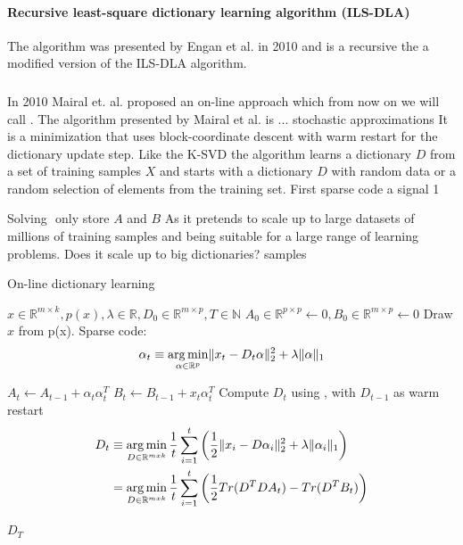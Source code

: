 \paragraph{Recursive least-square dictionary learning algorithm (ILS-DLA)}
The algorithm was presented by Engan et al. in 2010\cite{Engan2010} and is a
recursive the a modified version of the ILS-DLA algorithm.


\subsubsection{\trainDL}
\label{sec:mairal}
In 2010 Mairal et. al.\cite{Mairal2010} proposed an on-line approach which from
now on we will call \trainDL. The algorithm presented by Mairal et
al.\cite{Mairal2010} is ... 
stochastic approximations 
It is a minimization that uses block-coordinate descent with warm restart for
the dictionary update step.
Like the K-SVD the algorithm learns a dictionary $D$ from a set of training
samples $X$ and starts with a dictionary $D$ with random data or a random
selection of elements from the training set. 
First sparse code a signal  1

Solving $ $ 
only store $A$ and $B$ 
As it pretends to scale up to large datasets of millions of training samples
and being suitable for a large range of learning problems.
Does it scale up to big dictionaries?
samples\cite{Mairal2010}
\begin{algorithm}[H]
\caption[\trainDL]{On-line dictionary learning\cite{Mairal2010}}
\label{alg:trainDL}
\begin{algorithmic}[1]
\REQUIRE $x \in \mathbb{R}^{m \times k},  p \left( x \right), \lambda \in \mathbb{R}, D_0 \in \mathbb{R}^{m \times p}, T \in \mathbb{N}$
\STATE $A_0 \in \mathbb{R}^{p \times p} \gets  0, B_0 \in \mathbb{R}^{m \times p}\gets 0$
\STATE Draw $x$ from p(x).
\STATE Sparse code:
\begin{align*} 
\alpha_t \equiv \operatorname*{arg\,min}_{\alpha\in\mathbb{R}^{p}}  \lVert x_t - D_t\alpha \rVert^{2}_{2}  +  \lambda \lVert \alpha \rVert_{1}
\end{align*}

\STATE $A_t \gets A_{t-1} + \alpha_t\alpha_t^T$\label{alg:Aupdate}
\STATE $B_t \gets B_{t-1} + x_t\alpha_t^T$\label{alg:Bupdate}
\STATE Compute $D_t$ using , with $D_{t-1}$ as warm restart 
\begin{equation}
\begin{split}
D_t  & \equiv \operatorname*{arg\,min}_{D \in \mathbb{R}^{m x k}}  \frac{1}{t} \sum_{i=1}^t
\left( \frac{1}{2} \lVert x_i - D\alpha_i \rVert^{2}_{2}  +  \lambda \lVert
\alpha_i \rVert_{1} \right) \\
& = \operatorname*{arg\,min}_{D \in \mathbb{R}^{m x k}}  \frac{1}{t} \sum_{i=1}^t
\left( \frac{1}{2} Tr(D^TDA_t) - Tr(D^TB_t)\right) \label{eq:update}
\end{split}
\end{equation}
 
\ENDFOR
\RETURN $D_T$
\end{algorithmic}
\end{algorithm}


